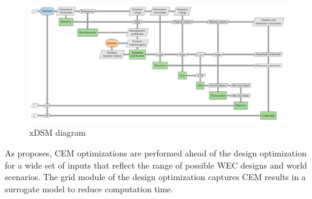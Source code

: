 \documentclass[10pt,twoside]{article}
\begin{document}
\begin{figure}
    \centering
    \includegraphics[width=.7\textwidth]{figures/out/xdsm_grid.pdf}
    \caption{xDSM diagram}
    \label{fig:n2}
\end{figure}

As \cite{mccabe_system_2023} proposes, CEM optimizations are performed ahead of the design optimization for a wide set of inputs that reflect the range of possible WEC designs and world scenarios. The grid module of the design optimization captures CEM results in a surrogate model to reduce computation time.

\end{document}
